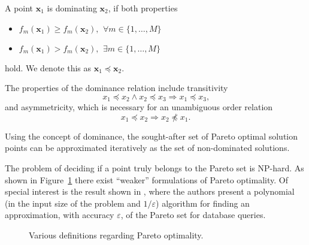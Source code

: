\begin{mydef} \label{def:dom}
A point $\mathbf{x}_1$ is dominating $\mathbf{x}_2$, if both properties
\begin{itemize}
  \item $f_m(\mathbf{x}_1) \geq f_m(\mathbf{x}_2) \text{,} \;\; \forall m \in
    \{ 1, \dots, M \}$
  \item $f_m(\mathbf{x}_1) > f_m(\mathbf{x}_2) \text{,} \;\; \exists m \in
    \{1, \dots, M\}$
\end{itemize}
hold. We denote this as $\mathbf{x}_1 \preceq \mathbf{x}_2$.
\end{mydef}

The properties of the dominance relation include transitivity
%
\begin{equation*}
  x_1 \preceq x_2 \wedge x_2 \preceq x_3 \Rightarrow x_1 \preceq x_3 \text{,}
\end{equation*}
%
  and asymmetricity, which is necessary for an unambiguous order relation
%
\begin{equation*}
  x_1 \preceq x_2 \Rightarrow x_2 \not\preceq x_1 \text{.}
\end{equation*}
%

Using the concept of dominance, the sought-after set of Pareto optimal
  solution points can be approximated iteratively as the set of non-dominated
  solutions.

The problem of deciding if a point truly belongs to the Pareto set is NP-hard.
As shown in Figure~\ref{fig:pareto-def} there exist ``weaker'' formulations of
  Pareto optimality.
Of special interest is the result shown in \cite{paya:01}, where the authors
  present a polynomial (in the input size of the problem and $1/\varepsilon$)
  algorithm for finding an approximation, with accuracy $\varepsilon$, of the
  Pareto set for database queries.

  \begin{figure}[tp]
  \begin{center}
  \end{center}
  \caption{Various definitions regarding Pareto optimality.}
  \label{fig:pareto-def}
\end{figure}





